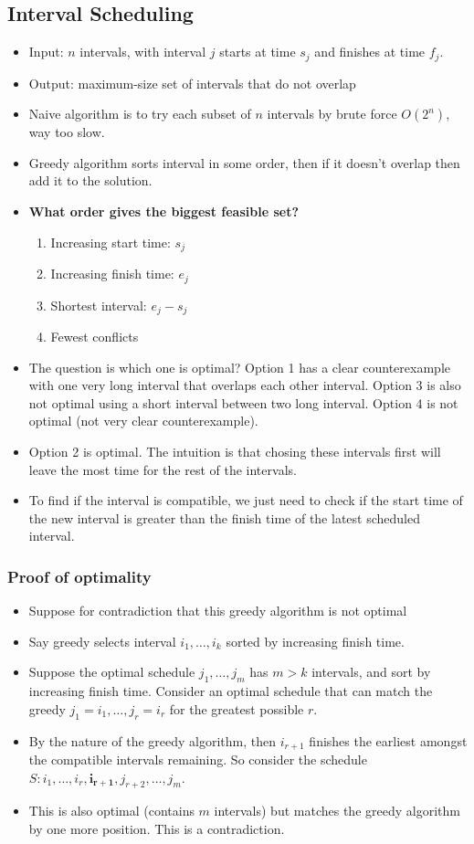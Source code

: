 \documentclass[a4paper]{article}
\begin{document}
\subsection{Interval Scheduling}
\begin{itemize}
    \item Input: $n$ intervals, with interval $j$ starts at time $s_j$ and finishes at time $f_j$.
    \item Output: maximum-size set of intervals that do not overlap
    \item Naive algorithm is to try each subset of $n$ intervals by brute force $O(2^n)$, way too slow.
    \item Greedy algorithm sorts interval in some order, then if it doesn't overlap then add it to the solution.
    \item \textbf{What order gives the biggest feasible set?}
    \begin{enumerate}
        \item Increasing start time: $s_j$
        \item Increasing finish time: $e_j$
        \item Shortest interval: $e_j-s_j$
        \item Fewest conflicts
    \end{enumerate}
    \item The question is which one is optimal? Option 1 has a clear counterexample with one very long interval that overlaps each other interval. Option 3 is also not optimal using a short interval between two long interval. Option 4 is not optimal (not very clear counterexample).
    \item Option 2 is optimal. The intuition is that chosing these intervals first will leave the most time for the rest of the intervals.
    \item To find if the interval is compatible, we just need to check if the start time of the new interval is greater than the finish time of the latest scheduled interval.
\end{itemize}
\subsubsection{Proof of optimality}
\begin{itemize}
    \item Suppose for contradiction that this greedy algorithm is not optimal
    \item Say greedy selects interval $i_1,\dots,i_k$ sorted by increasing finish time.
    \item Suppose the optimal schedule $j_1,\dots,j_m$ has $m>k$ intervals, and sort by increasing finish time. Consider an optimal schedule that can match the greedy $j_1=i_1,\dots,j_r=i_r$ for the greatest possible $r$.
    \item By the nature of the greedy algorithm, then $i_{r+1}$ finishes the earliest amongst the compatible intervals remaining. So consider the schedule $S:i_1,\dots,i_r,\mathbf{i_{r+1}},j_{r+2},\dots,j_m$. 
    \item This is also optimal (contains $m$ intervals) but matches the greedy algorithm by one more position. This is a contradiction.
\end{itemize}
\end{document}
